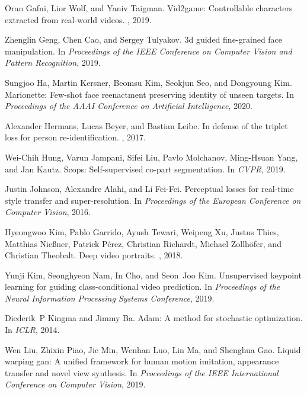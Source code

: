 \documentclass[final]{cvpr}
\begin{document}
\begin{thebibliography}{10}
Oran Gafni, Lior Wolf, and Yaniv Taigman.
\newblock Vid2game: Controllable characters extracted from real-world videos.
, 2019.

Zhenglin Geng, Chen Cao, and Sergey Tulyakov.
\newblock 3d guided fine-grained face manipulation.
\newblock In {\em Proceedings of the IEEE Conference on Computer Vision and
  Pattern Recognition}, 2019.

Sungjoo Ha, Martin Kersner, Beomsu Kim, Seokjun Seo, and Dongyoung Kim.
\newblock Marionette: Few-shot face reenactment preserving identity of unseen
  targets.
\newblock In {\em Proceedings of the AAAI Conference on Artificial
  Intelligence}, 2020.

Alexander Hermans, Lucas Beyer, and Bastian Leibe.
\newblock In defense of the triplet loss for person re-identification.
, 2017.

Wei-Chih Hung, Varun Jampani, Sifei Liu, Pavlo Molchanov, Ming-Hsuan Yang, and
  Jan Kautz.
\newblock Scops: Self-supervised co-part segmentation.
\newblock In {\em CVPR}, 2019.

Justin Johnson, Alexandre Alahi, and Li Fei-Fei.
\newblock Perceptual losses for real-time style transfer and super-resolution.
\newblock In {\em Proceedings of the European Conference on Computer Vision},
  2016.

Hyeongwoo Kim, Pablo Garrido, Ayush Tewari, Weipeng Xu, Justus Thies, Matthias
  Nie{\ss}ner, Patrick P{\'e}rez, Christian Richardt, Michael Zollh{\"o}fer,
  and Christian Theobalt.
\newblock Deep video portraits.
, 2018.

Yunji Kim, Seonghyeon Nam, In Cho, and Seon~Joo Kim.
\newblock Unsupervised keypoint learning for guiding class-conditional video
  prediction.
\newblock In {\em Proceedings of the Neural Information Processing Systems
  Conference}, 2019.

Diederik~P Kingma and Jimmy Ba.
\newblock Adam: A method for stochastic optimization.
\newblock In {\em ICLR}, 2014.

Wen Liu, Zhixin Piao, Jie Min, Wenhan Luo, Lin Ma, and Shenghua Gao.
\newblock Liquid warping gan: A unified framework for human motion imitation,
  appearance transfer and novel view synthesis.
\newblock In {\em Proceedings of the IEEE International Conference on Computer
  Vision}, 2019.


\end{thebibliography}
\end{document}
